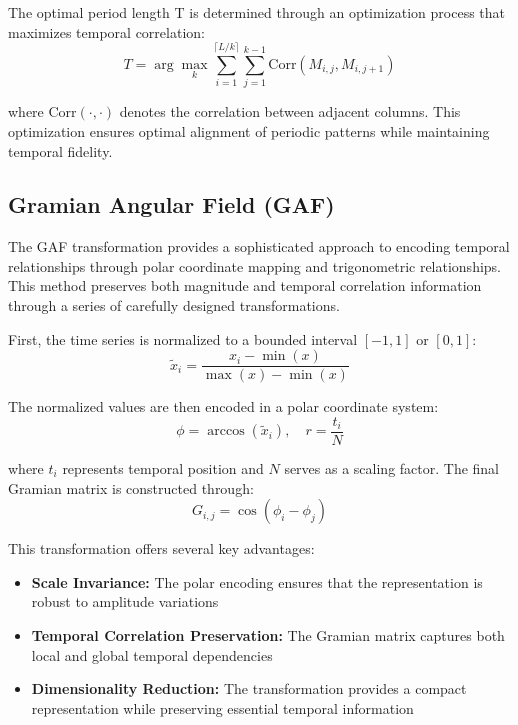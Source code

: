 The optimal period length T is determined through an optimization process that maximizes temporal correlation:
\begin{equation}
    T = \arg\max_{k} \sum_{i=1}^{\lceil L/k \rceil} \sum_{j=1}^{k-1} \text{Corr}(M_{i,j}, M_{i,j+1})
\end{equation}

where $\text{Corr}(\cdot,\cdot)$ denotes the correlation between adjacent columns. This optimization ensures optimal alignment of periodic patterns while maintaining temporal fidelity.

\subsection{Gramian Angular Field (GAF)}
The GAF transformation provides a sophisticated approach to encoding temporal relationships through polar coordinate mapping and trigonometric relationships. This method preserves both magnitude and temporal correlation information through a series of carefully designed transformations.

First, the time series is normalized to a bounded interval $[-1,1]$ or $[0,1]$:
\begin{equation}
    \tilde{x}_i = \frac{x_i - \min(x)}{\max(x) - \min(x)}
\end{equation}

The normalized values are then encoded in a polar coordinate system:
\begin{equation}
    \phi = \arccos(\tilde{x}_i), \quad r = \frac{t_i}{N}
\end{equation}

where $t_i$ represents temporal position and $N$ serves as a scaling factor. The final Gramian matrix is constructed through:
\begin{equation}
    G_{i,j} = \cos(\phi_i - \phi_j)
\end{equation}

This transformation offers several key advantages:
\begin{itemize}
    \item \textbf{Scale Invariance:} The polar encoding ensures that the representation is robust to amplitude variations
    \item \textbf{Temporal Correlation Preservation:} The Gramian matrix captures both local and global temporal dependencies
    \item \textbf{Dimensionality Reduction:} The transformation provides a compact representation while preserving essential temporal information
\end{itemize}

